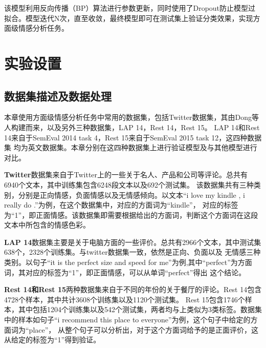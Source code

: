 该模型利用反向传播（BP）算法进行参数更新，同时使用了Dropout防止模型过拟合。模型迭代N次，直至收敛，最终模型即可在测试集上验证分类效果，实现方面级情感分析任务。

\section{实验设置}
\subsection{数据集描述及数据处理}
本章使用方面级情感分析任务中常用的数据集，包括Twitter数据集，其由Dong等人构建而来，以及另外三种数据集，LAP 14，Rest 14，Rest 15。
LAP 14和Rest 14来自于SemEval 2014 task 4，Rest 15来自于SemEval 2015 task 12，这四种数据集
均为英文数据集。本章分别在这四种数据集上进行验证模型及与其他模型进行对比。

\textbf{Twitter}数据集来自于Twitter上的一些关于名人、产品和公司等评论。总共有6940个文本，其中训练集包含6248段文本以及692个测试集。
该数据集共有三种类别，分别是正向情感，负面情感以及无情感倾向。以文本“i love my kindle , i really do .”为例，在这个数据集中，对应的方面词为“kindle”，
对应的标签为“1”，即正面情感。该数据集即需要根据给出的方面词，判断这个方面词在这段文本中所包含的情感色彩。

\textbf{LAP 14}数据集主要是关于电脑方面的一些评价。总共有2966个文本，其中测试集638个，2328个训练集。与twitter数据集一致，依然是正向、负面以及
无情感三种类别。以句子“it is the perfect size and speed for me”为例,其中“perfect”为方面词，其对应的标签为“1”，即正面情感，可以从单词“perfect”得出
这个结论。

\textbf{Rest 14和Rest 15}两种数据集来自于不同的年份的关于餐厅的评论。Rest 14包含4728个样本，其中共计3608个训练集以及1120个测试集。
Rest 15包含1746个样本，其中包括1204个训练集以及542个测试集，两者均与上类似为3类标签。数据集中的样本如句子“i recommend this place to everyone”为例，这个句子中给定的方面词为“place”，
从整个句子可以分析出，对于这个方面词给予的是正面评价，这从给定的标签为“1”得到验证。


